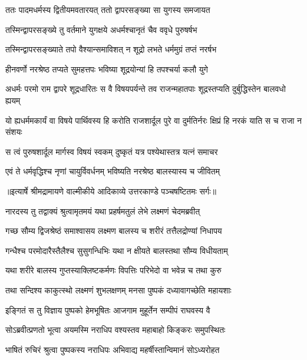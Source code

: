 \twolineshloka
{ततः पादमधर्मस्य द्वितीयमवतारयत्}
{ततो द्वापरसङ्ख्या सा युगस्य समजायत} %

\twolineshloka
{तस्मिन्द्वापरसङ्ख्ये तु वर्तमाने युगक्षये}
{अधर्मश्चानृतं चैव ववृधे पुरुषर्षभ} %

\twolineshloka
{तस्मिन्द्वापरसङ्ख्याते तपो वैश्यान्समाविशत्}
{न शूद्रो लभते धर्ममुग्रं तप्तं नरर्षभ} %

\twolineshloka
{हीनवर्णो नरश्रेष्ठ तप्यते सुमहत्तपः}
{भविष्या शूद्रयोन्यां हि तपश्चर्या कलौ युगे} %

\threelineshloka
{अधर्मः परमो राम द्वापरे शूद्रधारितः}
{स वै विषयपर्यन्ते तव राजन्महातपाः}
{शूद्रस्तप्यति दुर्बुद्धिस्तेन बालवधो ह्ययम्} %

\threelineshloka
{यो ह्यधर्ममकार्यं वा विषये पार्थिवस्य हि}
{करोति राजशार्दूल पुरे वा दुर्मतिर्नरः}
{क्षिप्रं हि नरकं याति स च राजा न संशयः} %

\twolineshloka
{स त्वं पुरुषशार्दूल मार्गस्व विषयं स्वकम्}
{दुष्कृतं यत्र पश्येथास्तत्र यत्नं समाचर} %

\twolineshloka
{एवं ते धर्मवृद्धिश्च नृणां चायुर्विवर्धनम्}
{भविष्यति नरश्रेष्ठ बालस्यास्य च जीवितम्} %


{॥इत्यार्षे श्रीमद्रामायणे वाल्मीकीये आदिकाव्ये उत्तरकाण्डे पञ्चषष्टितमः सर्गः॥}


\twolineshloka
{नारदस्य तु तद्वाक्यं श्रुत्वामृतमयं यथा}
{प्रहर्षमतुलं लेभे लक्ष्मणं चेदमब्रवीत्} %

\twolineshloka
{गच्छ सौम्य द्विजश्रेष्ठं समाश्वासय लक्ष्मण}
{बालस्य च शरीरं तत्तैलद्रोण्यां निधापय} %

\twolineshloka
{गन्धैश्च परमोदारैस्तैलैश्च सुसुगन्धिभिः}
{यथा न क्षीयते बालस्तथा सौम्य विधीयताम्} %

\twolineshloka
{यथा शरीरे बालस्य गुप्तस्याक्लिष्टकर्मणः}
{विपत्तिः परिभेदो वा भवेन्न च तथा कुरु} %

\twolineshloka
{तथा सन्दिश्य काकुत्स्थो लक्ष्मणं शुभलक्षणम्}
{मनसा पुष्पकं दध्यावागच्छेति महायशाः} %

\twolineshloka
{इङ्गितं स तु विज्ञाय पुष्पको हेमभूषितः}
{आजगाम मुहूर्तेन सम्पीपं राघवस्य वै} %

\twolineshloka
{सोऽब्रवीत्प्रणतो भूत्वा अयमस्मि नराधिप}
{वश्यस्तव महाबाहो किङ्करः समुपस्थितः} %

\twolineshloka
{भाषितं रुचिरं श्रुत्वा पुष्पकस्य नराधिपः}
{अभिवाद्य महर्षीस्तान्विमानं सोऽध्यरोहत} %

